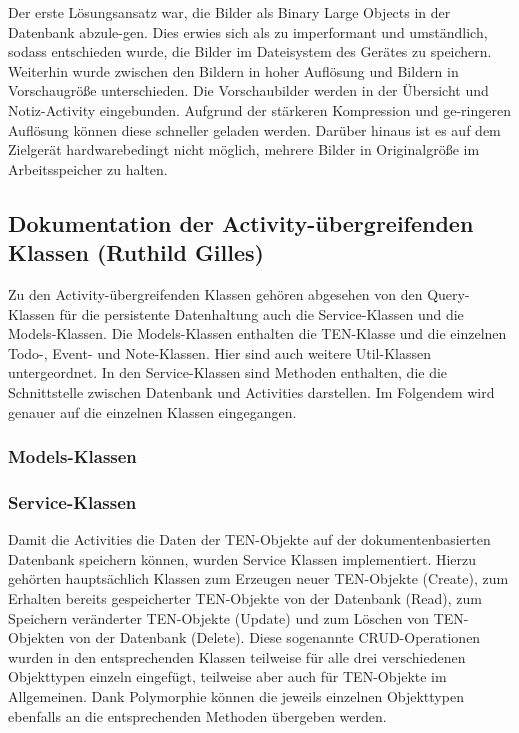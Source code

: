 Der erste Lösungsansatz war, die Bilder als Binary Large Objects in der Datenbank abzule-gen. Dies erwies sich als zu imperformant und umständlich, sodass entschieden wurde, die Bilder im Dateisystem des Gerätes zu speichern. Weiterhin wurde zwischen den Bildern in hoher Auflösung und Bildern in Vorschaugröße unterschieden. Die Vorschaubilder werden in der Übersicht und Notiz-Activity eingebunden. Aufgrund der stärkeren Kompression und ge-ringeren Auflösung können diese schneller geladen werden. Darüber hinaus ist es auf dem Zielgerät hardwarebedingt nicht möglich, mehrere Bilder in Originalgröße im Arbeitsspeicher zu halten.

\newpage
\subsection{Dokumentation der Activity-übergreifenden Klassen (Ruthild Gilles)}

Zu den Activity-übergreifenden Klassen gehören abgesehen von den Query-Klassen für die persistente Datenhaltung auch die Service-Klassen und die Models-Klassen. Die Models-Klassen enthalten die TEN-Klasse und die einzelnen Todo-, Event- und Note-Klassen. Hier sind auch weitere Util-Klassen untergeordnet. In den Service-Klassen sind Methoden enthalten, die die Schnittstelle zwischen Datenbank und Activities darstellen. Im Folgendem wird genauer auf die einzelnen Klassen eingegangen.

\subsubsection{Models-Klassen}

\subsubsection{Service-Klassen}

Damit die Activities die Daten der TEN-Objekte auf der dokumentenbasierten Datenbank speichern können, wurden Service Klassen implementiert. Hierzu gehörten hauptsächlich Klassen zum Erzeugen neuer TEN-Objekte (Create), zum Erhalten bereits gespeicherter TEN-Objekte von der Datenbank (Read), zum Speichern veränderter TEN-Objekte (Update) und zum Löschen von TEN-Objekten von der Datenbank (Delete). Diese sogenannte CRUD-Operationen wurden in den entsprechenden Klassen teilweise für alle drei verschiedenen Objekttypen einzeln eingefügt, teilweise aber auch für TEN-Objekte im Allgemeinen. Dank Polymorphie können die jeweils einzelnen Objekttypen ebenfalls an die entsprechenden Methoden übergeben werden.

